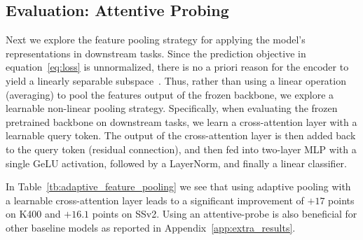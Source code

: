 \documentclass[twocolumn]{fairmeta}
\theoremstyle{plain}
\theoremstyle{definition}
\theoremstyle{remark}
\begin{document}
\subsection{Evaluation: Attentive Probing}
Next we explore the feature pooling strategy for applying the model's representations in downstream tasks.
Since the prediction objective in equation~\eqref{eq:loss} is unnormalized, there is no a priori reason for the encoder to yield a linearly separable subspace~\citep{chen2020simple}.
Thus, rather than using a linear operation (averaging) to pool the features output of the frozen backbone, we explore a learnable non-linear pooling strategy. %
Specifically, when evaluating the frozen pretrained backbone on downstream tasks, we learn a cross-attention layer with a learnable query token.
The output of the cross-attention layer is then added back to the query token (residual connection), and then fed into two-layer MLP with a single GeLU activation, followed by a LayerNorm, and finally a linear classifier.

In Table~\ref{tb:adaptive_feature_pooling} we see that using adaptive pooling with a  learnable cross-attention layer leads to a significant improvement of $+17$ points on K400 and $+16.1$ points on SSv2.
Using an attentive-probe is also beneficial for other baseline models as reported in Appendix~\ref{app:extra_results}.
\end{document}
